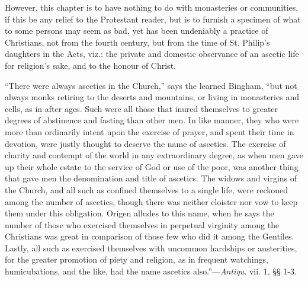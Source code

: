 However, this chapter is to have nothing to do with monasteries or
communities, if this be any relief to the Protestant reader, but is to
furnish a specimen of what to some persons may seem as bad, yet has
been undeniably a practice of Christians, not from the fourth century,
but from the time of St. Philip's daughters in the Acts, viz.: the
private and domestic observance of an ascetic life for religion's
sake, and to the honour of Christ.

``There were always ascetics in the Church,'' says the
learned Bingham, ``but not always monks retiring to the deserts
and mountains, or living in monasteries and cells, as in after ages.
Such were all those that inured themselves to greater degrees of
abstinence and fasting than other men. In like manner, they who
were more than ordinarily intent upon the
exercise of prayer, and spent their time in devotion, were justly
thought to deserve the name of ascetics. The exercise of charity and
contempt of the world in any extraordinary degree, as when men gave up
their whole estate to the service of God or use of the poor, was
another thing that gave men the denomination and title of ascetics.
The widows and virgins of the Church, and all such as confined
themselves to a single life, were reckoned among the number of
ascetics, though there was neither cloister nor vow to keep them under
this obligation. Origen alludes to this name, when he says the number
of those who exercised themselves in perpetual virginity among the
Christians was great in comparison of those few who did it among the
Gentiles. Lastly, all such as exercised themselves with uncommon
hardships or austerities, for the greater promotion of piety and
religion, as in frequent watchings, humicubations, and the like, had
the name ascetics also.''—\emph{Antiqu}. vii. 1, §§ 1-3.

